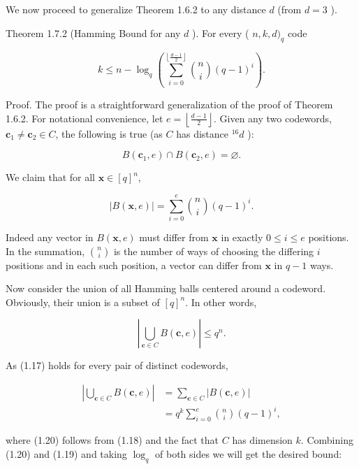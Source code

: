 \documentclass[10pt]{article}
\begin{document}
We now proceed to generalize Theorem 1.6.2 to any distance $d$ (from $d=3$ ).

Theorem 1.7.2 (Hamming Bound for any $d$ ). For every ( $n, k, d)_{q}$ code

$$
k \leq n-\log _{q}\left(\sum_{i=0}^{\left\lfloor\frac{d-1}{2}\right\rfloor}\binom{n}{i}(q-1)^{i}\right) .
$$

Proof. The proof is a straightforward generalization of the proof of Theorem 1.6.2. For notational convenience, let $e=\left\lfloor\frac{d-1}{2}\right\rfloor$. Given any two codewords, $\mathbf{c}_{1} \neq \mathbf{c}_{2} \in C$, the following is true (as $C$ has distance ${ }^{16} d$ ):


\begin{equation*}
B\left(\mathbf{c}_{1}, e\right) \cap B\left(\mathbf{c}_{2}, e\right)=\varnothing . \tag{1.17}
\end{equation*}


We claim that for all $\mathbf{x} \in[q]^{n}$,


\begin{equation*}
|B(\mathbf{x}, e)|=\sum_{i=0}^{e}\binom{n}{i}(q-1)^{i} . \tag{1.18}
\end{equation*}


Indeed any vector in $B(\mathbf{x}, e)$ must differ from $\mathbf{x}$ in exactly $0 \leq i \leq e$ positions. In the summation, $\binom{n}{i}$ is the number of ways of choosing the differing $i$ positions and in each such position, a vector can differ from $\mathbf{x}$ in $q-1$ ways.

Now consider the union of all Hamming balls centered around a codeword. Obviously, their union is a subset of $[q]^{n}$. In other words,


\begin{equation*}
\left|\bigcup_{\mathbf{c} \in C} B(\mathbf{c}, e)\right| \leq q^{n} . \tag{1.19}
\end{equation*}


As (1.17) holds for every pair of distinct codewords,


\begin{align*}
\left|\bigcup_{\mathbf{c} \in C} B(\mathbf{c}, e)\right| & =\sum_{\mathbf{c} \in C}|B(\mathbf{c}, e)| \\
& =q^{k} \sum_{i=0}^{e}\binom{n}{i}(q-1)^{i}, \tag{1.20}
\end{align*}


where (1.20) follows from (1.18) and the fact that $C$ has dimension $k$. Combining (1.20) and (1.19) and taking $\log _{q}$ of both sides we will get the desired bound:
\end{document}
